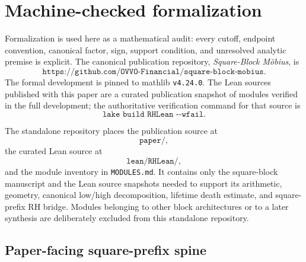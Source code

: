 \documentclass[11pt]{article}
\theoremstyle{definition}
\newcommand{\1}{\mathbf{1}}
\begin{document}
\section{Machine-checked formalization}
\label{sec:lean}

Formalization is used here as a mathematical audit: every cutoff, endpoint convention, canonical factor, sign, support condition, and unresolved analytic premise is explicit.  The canonical publication repository, \emph{Square-Block M\"obius}, is
\[
 \texttt{https://github.com/OVVO-Financial/square-block-mobius}.
\]
The formal development is pinned to mathlib \texttt{v4.24.0}.  The Lean sources published with this paper are a curated publication snapshot of modules verified in the full development; the authoritative verification command for that source is
\[
 \texttt{lake build RHLean -{}-wfail}.
\]

The standalone repository places the publication source at
\[
 \texttt{paper/},
\]
the curated Lean source at
\[
 \texttt{lean/RHLean/},
\]
and the module inventory in \texttt{MODULES.md}.  It contains only the square-block manuscript and the Lean source snapshots needed to support its arithmetic, geometry, canonical low/high decomposition, lifetime death estimate, and square-prefix RH bridge.  Modules belonging to other block architectures or to a later synthesis are deliberately excluded from this standalone repository.

\subsection{Paper-facing square-prefix spine}
\end{document}
